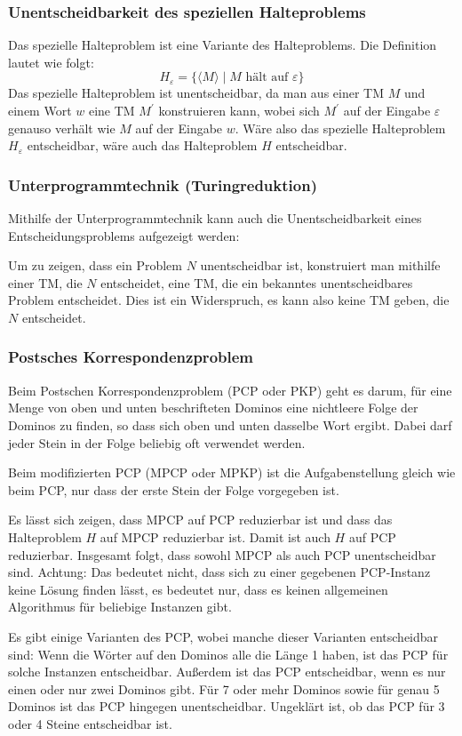 \documentclass[a4paper,parskip=half*,DIV=7,fontsize=11pt]{scrartcl}
\begin{document}
\subsubsection{Unentscheidbarkeit des speziellen Halteproblems}
Das spezielle Halteproblem ist eine Variante des Halteproblems. Die Definition lautet wie folgt:
\[
H_\varepsilon = \{ \langle M \rangle \mid M \text{ hält auf }\varepsilon \}
\]
Das spezielle Halteproblem ist unentscheidbar, da man aus einer TM $M$ und einem Wort $w$ eine TM $M^\prime$ konstruieren kann, wobei sich $M^\prime$ auf der Eingabe $\varepsilon$ genauso verhält wie $M$ auf der Eingabe $w$. Wäre also das spezielle Halteproblem $H_\varepsilon$ entscheidbar, wäre auch das Halteproblem $H$ entscheidbar.
\subsubsection{Unterprogrammtechnik (Turingreduktion)}
Mithilfe der Unterprogrammtechnik kann auch die  Unentscheidbarkeit eines Entscheidungsproblems aufgezeigt werden:

Um zu zeigen, dass ein Problem $N$ unentscheidbar ist, konstruiert man mithilfe einer TM, die $N$ entscheidet, eine TM, die ein bekanntes unentscheidbares Problem entscheidet. Dies ist ein Widerspruch, es kann also keine TM geben, die $N$ entscheidet.

\subsubsection{Postsches Korrespondenzproblem}
Beim Postschen Korrespondenzproblem (PCP oder PKP) geht es darum, für eine Menge von oben und unten beschrifteten Dominos eine nichtleere Folge der Dominos zu finden, so dass sich oben und unten dasselbe Wort ergibt. Dabei darf jeder Stein in der Folge beliebig oft verwendet werden.

Beim modifizierten PCP (MPCP oder MPKP) ist die Aufgabenstellung gleich wie beim PCP, nur dass der erste Stein der Folge vorgegeben ist.

Es lässt sich zeigen, dass MPCP auf PCP reduzierbar ist und dass das Halteproblem $H$ auf MPCP reduzierbar ist. Damit ist auch $H$ auf PCP reduzierbar. Insgesamt folgt, dass sowohl MPCP als auch PCP unentscheidbar sind. Achtung: Das bedeutet nicht, dass sich zu einer gegebenen PCP-Instanz keine Lösung finden lässt, es bedeutet nur, dass es keinen allgemeinen Algorithmus für beliebige Instanzen gibt.

Es gibt einige Varianten des PCP, wobei manche dieser Varianten entscheidbar sind:
Wenn die Wörter auf den Dominos alle die Länge 1 haben, ist das PCP für solche Instanzen entscheidbar. Außerdem ist das PCP entscheidbar, wenn es nur einen oder nur zwei Dominos gibt. Für 7 oder mehr Dominos sowie für genau 5 Dominos ist das PCP hingegen unentscheidbar. Ungeklärt ist, ob das PCP für 3 oder 4 Steine entscheidbar ist.
\end{document}
